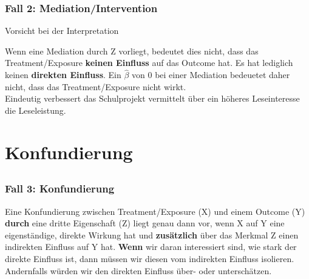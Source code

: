 \documentclass[18pt, aspectratio=169]{beamer}
\begin{document}
\begin{frame}
\frametitle{Fall 2: Mediation/Intervention}

\begin{block}{Vorsicht bei der Interpretation}

Wenn eine Mediation durch Z vorliegt, bedeutet dies nicht, dass das Treatment/Exposure \textbf{keinen Einfluss} auf das Outcome hat. Es hat lediglich keinen \textbf{direkten Einfluss}. Ein $\hat{\beta}$ von 0 bei einer Mediation bedeuetet daher nicht, dass das Treatment/Exposure nicht wirkt. 
\\[1em] Eindeutig verbessert das Schulprojekt vermittelt über ein höheres Leseinteresse die Leseleistung.
\end{block}

\end{frame}


\section{Konfundierung}
\subsection*{}
\begin{frame}
\frametitle{Fall 3: Konfundierung}
\begin{figure}
\centering
{}
\end{figure}
Eine Konfundierung zwischen Treatment/Exposure (X) und einem Outcome (Y) \textbf{durch} eine dritte Eigenschaft (Z) liegt genau dann vor, wenn X auf Y eine eigenständige, direkte Wirkung hat und \textbf{zusätzlich} über das Merkmal Z einen indirekten Einfluss auf Y hat. \textbf{Wenn} wir daran interessiert sind, wie stark der direkte Einfluss ist, dann müssen wir diesen vom indirekten Einfluss isolieren. Andernfalls würden wir den direkten Einfluss über- oder unterschätzen. 

\end{frame}
\end{document}
